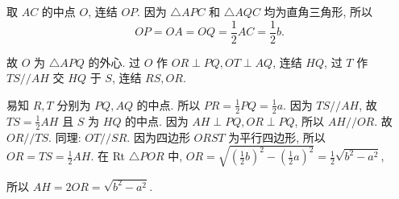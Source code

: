 \documentclass{March}
\begin{document}
\begin{solution}
	取 $A C$ 的中点 $O$, 连结 $O P$.
	因为 $\triangle A P C$ 和 $\triangle A Q C$ 均为直角三角形, 所以
	$$
		O P=O A=O Q=\frac{1}{2} A C=\frac{1}{2} b .
	$$

	故 $O$ 为 $\triangle A P Q$ 的外心.
	过 $O$ 作 $O R \perp P Q, O T \perp A Q$, 连结 $H Q$, 过 $T$
	作 $T S / / A H$ 交 $H Q$ 于 $S$, 连结 $R S ,  O R$.

	易知 $R ,  T$ 分别为 $P Q ,  A Q$ 的中点.
	所以 $P R=\frac{1}{2} P Q=\frac{1}{2} a$.
	因为 $T S / / A H$, 故 $T S=\frac{1}{2} A H$ 且 $S$ 为 $H Q$ 的中点.
	因为 $A H \perp P Q, O R \perp P Q$, 所以 $A H / / O R$.
	故 $O R / / T S$.
	同理: $O T / / S R$.
	因为四边形 $O R S T$ 为平行四边形, 所以 $O R=T S=\frac{1}{2} A H$.
	在 Rt $\triangle P O R$ 中, $O R=\sqrt{\left(\frac{1}{2} b\right)^2-\left(\frac{1}{2} a\right)^2}=\frac{1}{2} \sqrt{b^2-a^2}$,

	所以 $A H=2 O R=\sqrt{b^2-a^2}$.
\end{solution}


\end{document}
